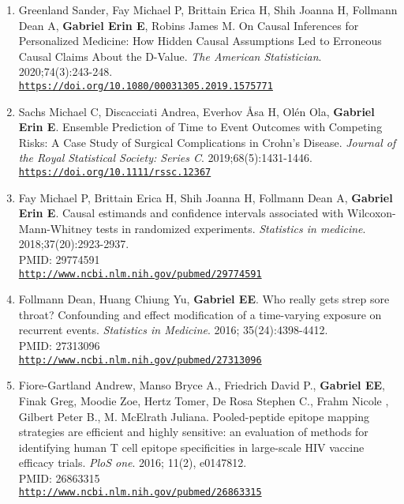 \documentclass[12pt]{article}
\providecommand \url[1]{\href{#1}{#1}}
\renewcommand*\url[1]{\href{#1}{\texttt{#1}}}
\begin{document}
\begin{enumerate}
\item Greenland Sander, Fay Michael P,  Brittain Erica H,  Shih Joanna H, Follmann  Dean A, \textbf{Gabriel Erin E}, Robins James M. On Causal Inferences for Personalized Medicine: How Hidden Causal Assumptions Led to Erroneous Causal Claims About the D-Value. \emph{The American Statistician}. 2020;74(3):243-248.\\
\url{https://doi.org/10.1080/00031305.2019.1575771}\\

\item Sachs Michael C, Discacciati Andrea,  Everhov \AA sa H, Ol\'en Ola, \textbf{Gabriel Erin E}. Ensemble Prediction of Time to Event Outcomes with Competing Risks: A Case Study of Surgical Complications in Crohn's Disease. \emph{Journal of the Royal Statistical Society: Series C}. 2019;68(5):1431-1446.\\
\url{https://doi.org/10.1111/rssc.12367}

\item Fay Michael P, Brittain Erica H, Shih Joanna H, Follmann Dean A, \textbf{Gabriel Erin E}. Causal estimands and confidence intervals associated with Wilcoxon-Mann-Whitney tests in randomized experiments. \emph{Statistics in medicine}. 2018;37(20):2923-2937.\\
PMID: 29774591\\
\url{http://www.ncbi.nlm.nih.gov/pubmed/29774591}


\item Follmann  Dean, Huang  Chiung Yu, \textbf{Gabriel  EE}.	Who really gets strep sore throat? Confounding and effect modification of a time-varying exposure on recurrent events. \emph{Statistics in Medicine}. 2016; 35(24):4398-4412.\\
PMID: 27313096\\
\url{http://www.ncbi.nlm.nih.gov/pubmed/27313096}

\item  Fiore-Gartland Andrew,   Manso Bryce A., Friedrich David P., \textbf{Gabriel EE},  Finak Greg, Moodie Zoe, Hertz Tomer, De Rosa Stephen C., Frahm Nicole , Gilbert Peter B., M.  McElrath Juliana. Pooled-peptide epitope mapping strategies are efficient and highly sensitive: an evaluation of methods for identifying human T cell epitope specificities in large-scale HIV vaccine efficacy trials. \emph{PloS one}. 2016; 11(2), e0147812.\\
PMID: 26863315\\
\url{http://www.ncbi.nlm.nih.gov/pubmed/26863315}



\end{enumerate}
\end{document}
